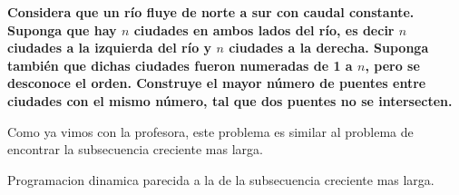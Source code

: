\textbf{Considera que un r\'io fluye de norte a sur con caudal constante. Suponga que hay $n$ ciudades en ambos lados del r\'io, es decir $n$ ciudades a la izquierda del r\'io y $n$ ciudades a la derecha. Suponga tambi\'en que dichas ciudades fueron numeradas de 1 a $n$, pero se desconoce el orden. Construye el mayor n\'umero de puentes entre ciudades con el mismo n\'umero, tal que dos puentes no se intersecten.}\vspace{.2cm}

Como ya vimos con la profesora, este problema es similar al problema de encontrar la subsecuencia creciente mas larga. \vspace{.2cm}

\textcolor{bibi}{Programacion dinamica parecida a la de la subsecuencia creciente mas larga.}\vspace{.2cm}

